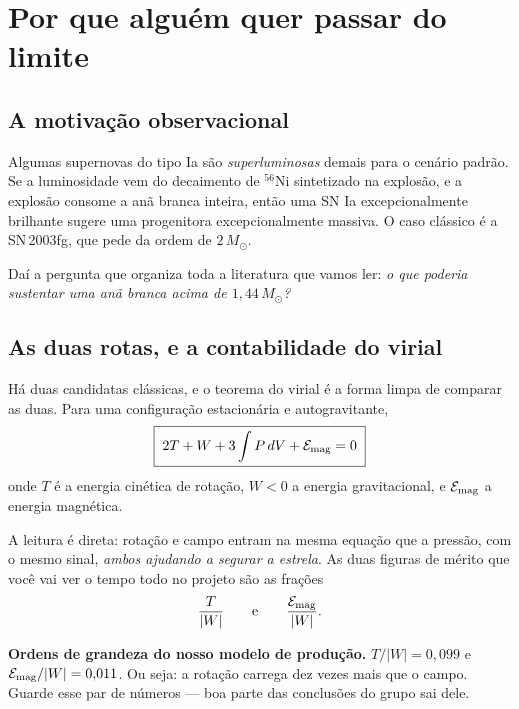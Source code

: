 \documentclass[11pt,a4paper]{article}
\newcommand{\Msun}{M_\odot}
\begin{document}
\section{Por que alguém quer passar do limite}

\subsection{A motivação observacional}

Algumas supernovas do tipo Ia são \emph{superluminosas} demais para o cenário
padrão. Se a luminosidade vem do decaimento de $^{56}$Ni sintetizado na
explosão, e a explosão consome a anã branca inteira, então uma SN Ia
excepcionalmente brilhante sugere uma progenitora excepcionalmente massiva.
O caso clássico é a SN\,2003fg, que pede da ordem de $2\,\Msun$.

Daí a pergunta que organiza toda a literatura que vamos ler: \emph{o que
poderia sustentar uma anã branca acima de $1{,}44\,\Msun$?}

\subsection{As duas rotas, e a contabilidade do virial}

Há duas candidatas clássicas, e o teorema do virial é a forma limpa de
comparar as duas. Para uma configuração estacionária e autogravitante,
\begin{equation}
\boxed{\;2T + W + 3\int P\,dV + \mathcal{E}_{\rm mag} = 0\;}
\label{eq:virial}
\end{equation}
onde $T$ é a energia cinética de rotação, $W < 0$ a energia gravitacional,
e $\mathcal{E}_{\rm mag}$ a energia magnética.

A leitura é direta: rotação e campo entram na mesma equação que a pressão, com
o mesmo sinal, \emph{ambos ajudando a segurar a estrela}. As duas figuras de
mérito que você vai ver o tempo todo no projeto são as frações
\begin{equation}
\frac{T}{|W|}
\qquad\text{e}\qquad
\frac{\mathcal{E}_{\rm mag}}{|W|} .
\end{equation}

\begin{caixa}
\textbf{Ordens de grandeza do nosso modelo de produção.}
$T/|W| = 0{,}099$ e $\mathcal{E}_{\rm mag}/|W| = 0{,}011$. Ou seja: a rotação
carrega dez vezes mais que o campo. Guarde esse par de números --- boa parte
das conclusões do grupo sai dele.
\end{caixa}
\end{document}
